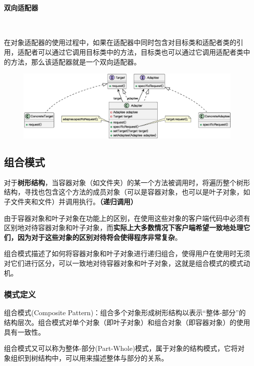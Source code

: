 \paragraph*{双向适配器}~{} \par
在对象适配器的使用过程中，如果在适配器中同时包含对目标类和适配者类的引用，适配者可以通过它调用目标类中的方法，目标类也可以通过它调用适配者类中的方法，那么该适配器就是一个双向适配器。
\begin{figure}[H]
    \vspace{-0.5em}
	\centering
	\includegraphics[width=\textwidth]{images/适配器模式拓展3.eps}
    \vspace{-1em}
\end{figure}


\subsection{组合模式}
对于\textbf{树形结构}，当容器对象（如文件夹）的某一个方法被调用时，将遍历整个树形结构，寻找也包含这个方法的成员对象（可以是容器对象，也可以是叶子对象，如子文件夹和文件）并调用执行。\textbf{（递归调用）}

由于容器对象和叶子对象在功能上的区别，在使用这些对象的客户端代码中必须有区别地对待容器对象和叶子对象，而\textbf{实际上大多数情况下客户端希望一致地处理它们，因为对于这些对象的区别对待将会使得程序非常复杂}。

组合模式描述了如何将容器对象和叶子对象进行递归组合，使得用户在使用时无须对它们进行区分，可以一致地对待容器对象和叶子对象，这就是组合模式的模式动机。

\subsubsection{模式定义}
组合模式(Composite Pattern)：组合多个对象形成树形结构以表示“整体-部分”的结构层次。组合模式对单个对象（即叶子对象）和组合对象（即容器对象）的使用具有一致性。

组合模式又可以称为整体-部分(Part-Whole)模式，属于对象的结构模式，它将对象组织到树结构中，可以用来描述整体与部分的关系。

